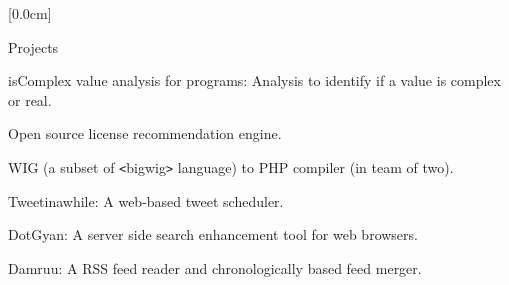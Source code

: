 \documentclass{resume} %
\begin{document}
[0.0cm]
\begin{rSection}{Projects}
\smallskip
\begin{lSubsection}
    \item isComplex value analysis for \matlab programs: Analysis to identify if a value is complex or real. 
    \item Open source license recommendation engine.
    \item WIG (a subset of \verb+<+bigwig\verb+>+ language) to PHP compiler (in team of two).
    \item Tweetinawhile: A web-based tweet scheduler.
    \item DotGyan: A server side search enhancement tool for web browsers.
    \item Damruu: A RSS feed reader and chronologically based feed merger.
\end{lSubsection}
\end{rSection}

\end{document}
